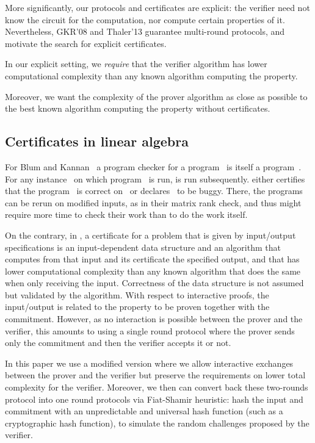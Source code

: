 \documentclass{article}
\begin{document}
More significantly, our protocols and certificates are explicit:
the verifier need not know the circuit for the computation,
nor compute certain properties of it.
Nevertheless, GKR'08 \cite{Goldwasser:2008:delegating} and Thaler'13  \cite{Thaler:2013:crypto}
guarantee multi-round protocols,  
and motivate the search for explicit certificates. 

 
In our explicit setting, we {\em require} that the verifier algorithm has
lower computational complexity than any known algorithm computing the property.
 
Moreover, we want  
the complexity of the prover algorithm  
as close as
possible to the best known algorithm computing the property without
certificates.  

\subsection{Certificates in linear algebra}
For Blum and Kannan~\cite{Blum:1995:checkwork} a program checker for a
program~ is itself a program~. For any instance~ on which program~
is run,  is run subsequently.  either certifies that the program~ is
correct on~ or declares~ to be buggy. There, the programs can be rerun on
modified inputs, as in their matrix rank check, and thus might require more time
to check their work than to do the work itself.

On the contrary, in \cite{KLYZ09,Kaltofen:2011:quadcert}, a certificate for a
problem that is given by input/output specifications is an input-dependent data
structure and an algorithm that computes from that input and its certificate the
specified output, and that has lower computational complexity than any known
algorithm that does the same when only receiving the input. Correctness of the
data structure is not assumed but validated by the algorithm. 
With respect to interactive proofs, the input/output is related to the property
to be proven together with the commitment.
However, as no interaction is possible between the prover and the verifier, this
amounts to using a single round protocol where the prover sends only the
commitment and then the verifier accepts it or not. 

In this paper we use a modified version where we allow interactive exchanges
between the prover and the verifier but preserve the requirements on lower total
complexity for the verifier.
Moreover, we then can convert back these two-rounds protocol into one round
protocols via Fiat-Shamir heuristic: hash the input and commitment with an
unpredictable and universal hash function  (such as a cryptographic hash
function), to simulate the random challenges proposed by the verifier. 
\end{document}
